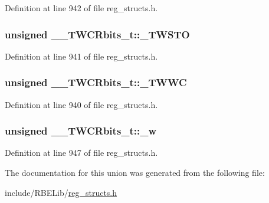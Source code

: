 Definition at line 942 of file reg\+\_\+structs.\+h.

\hypertarget{union_____t_w_c_rbits__t_a7f3866509f9a4f3be7a30f491f4b8248}{
\subsubsection[{\+\_\+\+T\+W\+S\+T\+O}]{\setlength{\rightskip}{0pt plus 5cm}unsigned \+\_\+\+\_\+\+T\+W\+C\+Rbits\+\_\+t\+::\+\_\+\+T\+W\+S\+T\+O}}\label{union_____t_w_c_rbits__t_a7f3866509f9a4f3be7a30f491f4b8248}


Definition at line 941 of file reg\+\_\+structs.\+h.

\hypertarget{union_____t_w_c_rbits__t_aac48237935a77e00b9440f81e5adeeaa}{
\subsubsection[{\+\_\+\+T\+W\+W\+C}]{\setlength{\rightskip}{0pt plus 5cm}unsigned \+\_\+\+\_\+\+T\+W\+C\+Rbits\+\_\+t\+::\+\_\+\+T\+W\+W\+C}}\label{union_____t_w_c_rbits__t_aac48237935a77e00b9440f81e5adeeaa}


Definition at line 940 of file reg\+\_\+structs.\+h.

\hypertarget{union_____t_w_c_rbits__t_aa0b5fffb097c5e65a8090197a7470e6b}{
\subsubsection[{\+\_\+w}]{\setlength{\rightskip}{0pt plus 5cm}unsigned \+\_\+\+\_\+\+T\+W\+C\+Rbits\+\_\+t\+::\+\_\+w}}\label{union_____t_w_c_rbits__t_aa0b5fffb097c5e65a8090197a7470e6b}


Definition at line 947 of file reg\+\_\+structs.\+h.



The documentation for this union was generated from the following file\+:\begin{DoxyCompactItemize}
\item 
include/\+R\+B\+E\+Lib/\hyperlink{reg__structs_8h}{reg\+\_\+structs.\+h}\end{DoxyCompactItemize}
